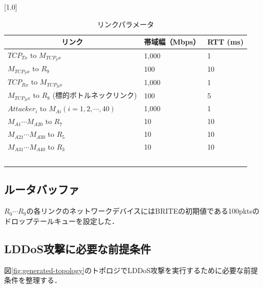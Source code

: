 \documentclass[Japanese]{dicomopapers}
\begin{document}
\begin{table}[tb]
    \caption{リンクパラメータ}
    \label{tab:link-param}
    \begin{center}
        \scalebox{0.80}[1.0]{
            \begin{tabular}{lll}
                \hline
                \multicolumn{1}{c}{リンク}                           & \multicolumn{1}{c}{帯域幅（Mbps）} & \multicolumn{1}{c}{RTT (ms)} \\ \hline
                $TCP_{Tx}$ to $M_{TCP_Tx}$                        & 1,000                         & 1                            \\
                $M_{TCP_Tx}$ to $R_{9}$                           & 100                           & 10                           \\
                $TCP_{Rx}$ to $M_{TCP_Rx}$                        & 1,000                         & 1                            \\
                $M_{TCP_Rx}$ to $R_{8}$ (標的ボトルネックリンク)             & 100                           & 5                            \\
                $Attacker_{i}$ to $M_{Ai} (i = 1, 2, \cdots, 40)$ & 1,000                         & 1                            \\
                $M_{A1} \cdots M_{A20}$ to $R_{7}$                & 10                            & 10                           \\
                $M_{A21} \cdots M_{A30}$ to $R_{5}$               & 10                            & 10                           \\
                $M_{A31} \cdots M_{A40}$ to $R_{3}$               & 10                            & 10                           \\　\\ \hline
            \end{tabular}
        }
    \end{center}
\end{table}

\subsection{ルータバッファ}
$R_{0} \cdots R_{9}$の各リンクのネットワークデバイスにはBRITEの初期値である100pktsのドロップテールキューを設定した．

\subsection{LDDoS攻撃に必要な前提条件}
図\ref{fig:generated-topology}のトポロジでLDDoS攻撃を実行するために必要な前提条件を整理する．
\end{document}
